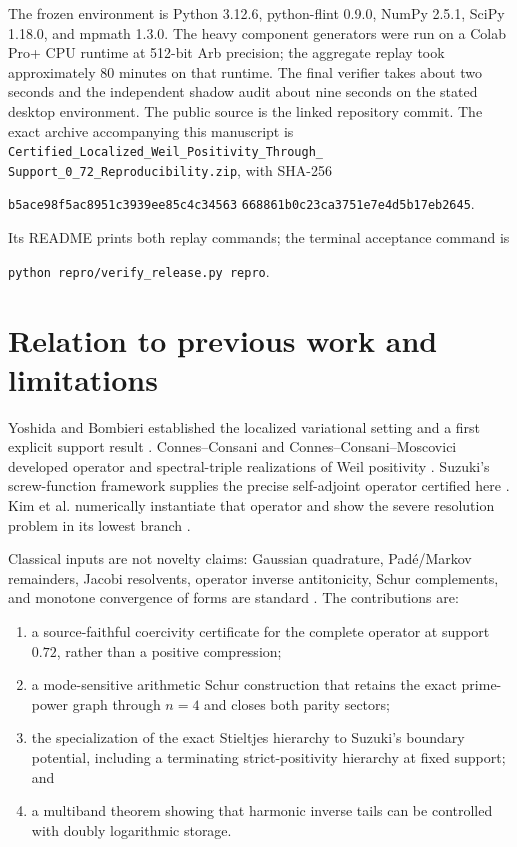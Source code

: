 \documentclass[10pt]{article}
\begin{document}
The frozen environment is Python 3.12.6, python-flint 0.9.0, NumPy 2.5.1,
SciPy 1.18.0, and mpmath 1.3.0.  The heavy component generators were run on a
Colab Pro+ CPU runtime at 512-bit Arb precision; the aggregate replay took
approximately 80 minutes on that runtime.  The final verifier takes about two
seconds and the independent shadow audit about nine seconds on the stated
desktop environment.  The public source is the linked repository commit.
The exact archive accompanying this manuscript is
\nolinkurl{Certified_Localized_Weil_Positivity_Through_}\linebreak
\nolinkurl{Support_0_72_Reproducibility.zip}, with SHA-256
\begin{center}\small
\texttt{b5ace98f5ac8951c3939ee85c4c34563}\linebreak
\texttt{668861b0c23ca3751e7e4d5b17eb2645}.
\end{center}
Its README prints both replay commands; the terminal acceptance command is
\begin{center}\small
\texttt{python~repro/verify\_release.py~repro}.
\end{center}

\section{Relation to previous work and limitations}

Yoshida and Bombieri established the localized variational setting and a first
explicit support result \cite{Yoshida1992,Bombieri2000}.  Connes--Consani and
Connes--Consani--Moscovici developed operator and spectral-triple realizations
of Weil positivity \cite{ConnesConsani2023,CCM2025}.  Suzuki's screw-function
framework supplies the precise self-adjoint operator certified here
\cite{Suzuki2026}.  Kim et al. numerically instantiate that operator and show
the severe resolution problem in its lowest branch \cite{KimEtAl2026}.

Classical inputs are not novelty claims: Gaussian quadrature, Pad\'e/Markov
remainders, Jacobi resolvents, operator inverse antitonicity, Schur complements,
and monotone convergence of forms are standard
\cite{GolubWelsch1969,FawziEtAl2019,Haynsworth1968,Simon1978,Kato1995}.
The contributions are:
\begin{enumerate}
\item a source-faithful coercivity certificate for the complete operator at
support $0.72$, rather than a positive compression;
\item a mode-sensitive arithmetic Schur construction that retains the exact
prime-power graph through $n=4$ and closes both parity sectors;
\item the specialization of the exact Stieltjes hierarchy to Suzuki's boundary
potential, including a terminating strict-positivity hierarchy at fixed
support; and
\item a multiband theorem showing that harmonic inverse tails can
be controlled with doubly logarithmic storage.
\end{enumerate}
\end{document}
